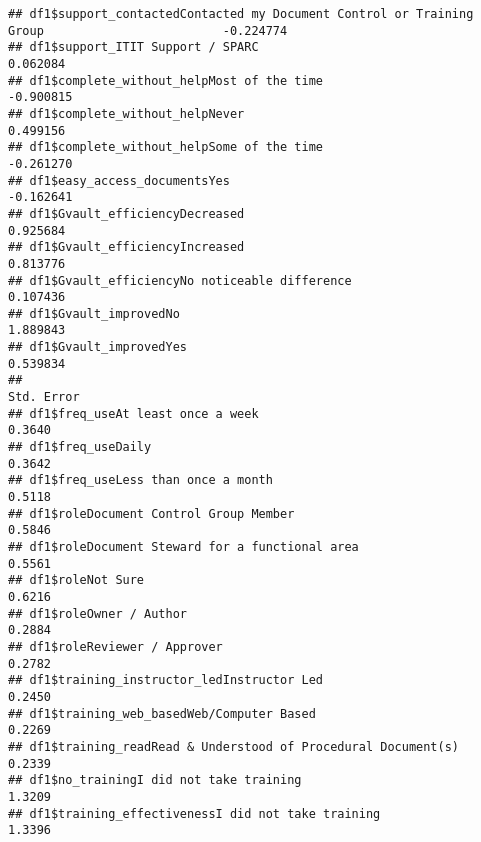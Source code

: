 \documentclass[]{article}
\begin{document}
\begin{verbatim}
## df1$support_contactedContacted my Document Control or Training Group                         -0.224774
## df1$support_ITIT Support / SPARC                                                              0.062084
## df1$complete_without_helpMost of the time                                                    -0.900815
## df1$complete_without_helpNever                                                                0.499156
## df1$complete_without_helpSome of the time                                                    -0.261270
## df1$easy_access_documentsYes                                                                 -0.162641
## df1$Gvault_efficiencyDecreased                                                                0.925684
## df1$Gvault_efficiencyIncreased                                                                0.813776
## df1$Gvault_efficiencyNo noticeable difference                                                 0.107436
## df1$Gvault_improvedNo                                                                         1.889843
## df1$Gvault_improvedYes                                                                        0.539834
##                                                                                              Std. Error
## df1$freq_useAt least once a week                                                                 0.3640
## df1$freq_useDaily                                                                                0.3642
## df1$freq_useLess than once a month                                                               0.5118
## df1$roleDocument Control Group Member                                                            0.5846
## df1$roleDocument Steward for a functional area                                                   0.5561
## df1$roleNot Sure                                                                                 0.6216
## df1$roleOwner / Author                                                                           0.2884
## df1$roleReviewer / Approver                                                                      0.2782
## df1$training_instructor_ledInstructor Led                                                        0.2450
## df1$training_web_basedWeb/Computer Based                                                         0.2269
## df1$training_readRead & Understood of Procedural Document(s)                                     0.2339
## df1$no_trainingI did not take training                                                           1.3209
## df1$training_effectivenessI did not take training                                                1.3396

\end{verbatim}
\end{document}

